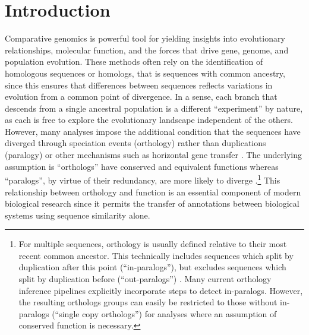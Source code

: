 \documentclass[10pt,letterpaper]{article}
\begin{document}
\section*{Introduction}
Comparative genomics is powerful tool for yielding insights into evolutionary relationships, molecular function, and the forces that drive gene, genome, and population evolution. These methods often rely on the identification of homologous sequences or homologs, that is sequences with common ancestry, since this ensures that differences between sequences reflects variations in evolution from a common point of divergence. In a sense, each branch that descends from a single ancestral population is a different ``experiment'' by nature, as each is free to explore the evolutionary landscape independent of the others. However, many analyses impose the additional condition that the sequences have diverged through speciation events (orthology) rather than duplications (paralogy) or other mechanisms such as horizontal gene transfer \cite{Fitch1970}. The underlying assumption is ``orthologs'' have conserved and equivalent functions whereas ``paralogs'', by virtue of their redundancy, are more likely to diverge \cite{Ohno1970, Nowak1997, Altenhoff2012, Pegueroles2013, Soria2014}.\footnote{For multiple sequences, orthology is usually defined relative to their most recent common ancestor. This technically includes sequences which split by duplication after this point (``in-paralogs''), but excludes sequences which split by duplication before (``out-paralogs'') \cite{Remm2001}. Many current orthology inference pipelines explicitly incorporate steps to detect in-paralogs. However, the resulting orthologs groups can easily be restricted to those without in-paralogs (``single copy orthologs'') for analyses where an assumption of conserved function is necessary.} This relationship between orthology and function is an essential component of modern biological research since it permits the transfer of annotations between biological systems using sequence similarity alone.
\end{document}
